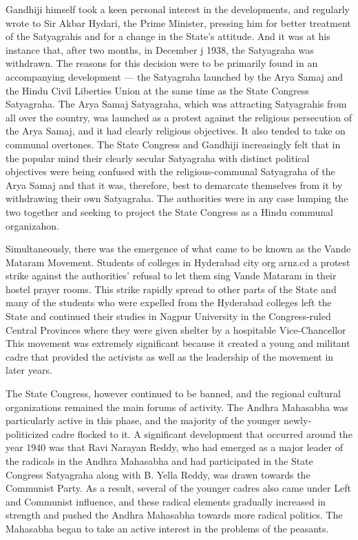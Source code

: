 Gandhiji himself took a keen personal interest in the developments, and regularly wrote to Sir Akbar Hydari, the Prime Minister, pressing him for better treatment of the Satyagrahis and for a change in the State's attitude. And it was at his instance that, after two months, in December j 1938, the Satyagraha was withdrawn. The reasons for this decision were to be primarily found in an accompanying development — the Satyagraha launched by the Arya Samaj and the Hindu Civil Liberties Union at the same time as the State Congress Satyagraha. The Arya Samaj Satyagraha, which was attracting Satyagrahis from all over the country, was launched as a protest against the religious persecution of the Arya Samaj, and it had clearly religious objectives. It also tended to take on communal overtones. The State Congress and Gandhiji increasingly felt that in the popular mind their clearly secular Satyagraha with distinct political objectives were being confused with the religious-communal Satyagraha of the Arya Samaj and that it was, therefore, best to demarcate themselves from it by withdrawing their own Satyagraha. The authorities were in any case lumping the two together and seeking to project the State Congress as a Hindu communal organizahon. 

Simultaneously, there was the emergence of what came to be known as the Vande Mataram Movement. Students of colleges in Hyderabad city org arnz.cd a protest strike against the authorities' refusal to let them sing Vande Mataram in their hostel prayer rooms. This strike rapidly spread to other parts of the State and many of the students who were expelled from the Hyderabad colleges left the State and continued their studies in Nagpur University in the Congress-ruled Central Provinces where they were given shelter by a hospitable Vice-Chancellor This movement was extremely significant because it created a young and militant cadre that provided the activists as well as the leadership of the movement in later years. 

The State Congress, however continued to be banned, and the regional cultural organizations remained the main forums of activity. The Andhra Mahasabha was particularly active in this phase, and the majority of the younger newly-politicized cadre flocked to it. A significant development that occurred around the year 1940 was that Ravi Narayan Reddy, who had emerged as a major leader of the radicals in the Andhra Mahasabha and had participated in the State Congress Satyagraha along with B. Yella Reddy, was drawn towards the Communist Party. As a result, several of the younger cadres also came under Left and Communist influence, and these radical elements gradually increased in strength and pushed the Andhra Mahasabha towards more radical politics. The Mahasabha began to take an active interest in the problems of the peasants. 

